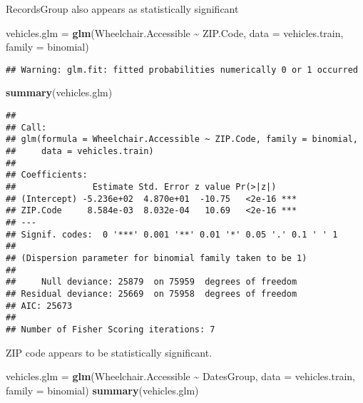 \documentclass[
]{article}
\newenvironment{Shaded}{\begin{snugshade}}{\end{snugshade}}
\newcommand{\AttributeTok}[1]{\textcolor[rgb]{0.13,0.29,0.53}{#1}}
\newcommand{\FunctionTok}[1]{\textcolor[rgb]{0.13,0.29,0.53}{\textbf{#1}}}
\newcommand{\NormalTok}[1]{#1}
\newcommand{\OtherTok}[1]{\textcolor[rgb]{0.56,0.35,0.01}{#1}}
\newcommand{\SpecialCharTok}[1]{\textcolor[rgb]{0.81,0.36,0.00}{\textbf{#1}}}
\begin{document}
RecordsGroup also appears as statistically significant

\begin{Shaded}
\begin{Highlighting}[]
\NormalTok{vehicles.glm }\OtherTok{=} \FunctionTok{glm}\NormalTok{(Wheelchair.Accessible }\SpecialCharTok{\textasciitilde{}}\NormalTok{ ZIP.Code, }\AttributeTok{data =}\NormalTok{ vehicles.train, }
                   \AttributeTok{family =}\NormalTok{ binomial)}
\end{Highlighting}
\end{Shaded}

\begin{verbatim}
## Warning: glm.fit: fitted probabilities numerically 0 or 1 occurred
\end{verbatim}

\begin{Shaded}
\begin{Highlighting}[]
\FunctionTok{summary}\NormalTok{(vehicles.glm)}
\end{Highlighting}
\end{Shaded}

\begin{verbatim}
## 
## Call:
## glm(formula = Wheelchair.Accessible ~ ZIP.Code, family = binomial, 
##     data = vehicles.train)
## 
## Coefficients:
##               Estimate Std. Error z value Pr(>|z|)    
## (Intercept) -5.236e+02  4.870e+01  -10.75   <2e-16 ***
## ZIP.Code     8.584e-03  8.032e-04   10.69   <2e-16 ***
## ---
## Signif. codes:  0 '***' 0.001 '**' 0.01 '*' 0.05 '.' 0.1 ' ' 1
## 
## (Dispersion parameter for binomial family taken to be 1)
## 
##     Null deviance: 25879  on 75959  degrees of freedom
## Residual deviance: 25669  on 75958  degrees of freedom
## AIC: 25673
## 
## Number of Fisher Scoring iterations: 7
\end{verbatim}

ZIP code appears to be statistically significant.

\begin{Shaded}
\begin{Highlighting}[]
\NormalTok{vehicles.glm }\OtherTok{=} \FunctionTok{glm}\NormalTok{(Wheelchair.Accessible }\SpecialCharTok{\textasciitilde{}}\NormalTok{ DatesGroup, }\AttributeTok{data =}\NormalTok{ vehicles.train, }
                   \AttributeTok{family =}\NormalTok{ binomial)}
\FunctionTok{summary}\NormalTok{(vehicles.glm)}
\end{Highlighting}
\end{Shaded}
\end{document}
